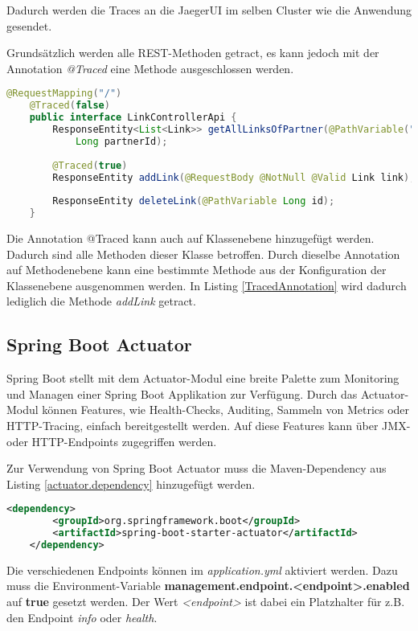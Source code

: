 Dadurch werden die Traces an die JaegerUI im selben Cluster wie die Anwendung gesendet.

Grundsätzlich werden alle REST-Methoden getract, es kann jedoch mit der Annotation \textit{@Traced} eine Methode ausgeschlossen werden.
\begin{lstlisting}[language=java, caption=LinkControllerApi.java, label=TracedAnnotation]
	@RequestMapping("/")
	@Traced(false)
	public interface LinkControllerApi {
		ResponseEntity<List<Link>> getAllLinksOfPartner(@PathVariable("id") 
			Long partnerId);
		
		@Traced(true)
		ResponseEntity addLink(@RequestBody @NotNull @Valid Link link);
		
		ResponseEntity deleteLink(@PathVariable Long id);
	}
\end{lstlisting}

Die Annotation @Traced kann auch auf Klassenebene hinzugefügt werden. Dadurch sind alle Methoden dieser Klasse betroffen. Durch dieselbe Annotation auf Methodenebene kann eine bestimmte Methode aus der Konfiguration der Klassenebene ausgenommen werden. In Listing \ref{TracedAnnotation} wird dadurch lediglich die Methode \textit{addLink} getract.

\subsection{Spring Boot Actuator}
Spring Boot stellt mit dem Actuator-Modul eine breite Palette zum Monitoring und Managen einer Spring Boot Applikation zur Verfügung. Durch das Actuator-Modul können Features, wie Health-Checks, Auditing, Sammeln von Metrics oder HTTP-Tracing, einfach bereitgestellt werden. Auf diese Features kann über JMX- oder HTTP-Endpoints zugegriffen werden. 

Zur Verwendung von Spring Boot Actuator muss die Maven-Dependency aus Listing \ref{actuator.dependency} hinzugefügt werden.
\begin{lstlisting}[language=xml, caption=pom.xml, label=actuator.dependency]
	<dependency>
		<groupId>org.springframework.boot</groupId>
		<artifactId>spring-boot-starter-actuator</artifactId>
	</dependency>
\end{lstlisting} 

Die verschiedenen Endpoints können im \textit{application.yml} aktiviert werden. Dazu muss die Environment-Variable \textbf{management.endpoint.<endpoint>.enabled} auf \textbf{true} gesetzt werden. Der Wert \textit{<endpoint>} ist dabei ein Platzhalter für z.B. den Endpoint \textit{info} oder \textit{health}.

